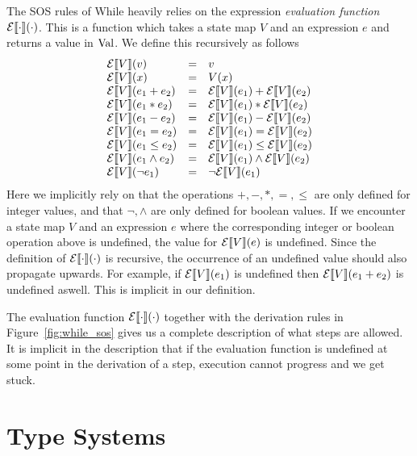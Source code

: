 The SOS rules of While heavily relies on the expression \emph{evaluation
function} $\mathcal{E}\llbracket \cdot \rrbracket(\cdot)$. This is a function which takes a state map
$V$ and an expression $e$ and returns a value in $\mbox{$\mathrm{Val}$}$. We define this
recursively as follows
\begin{equation*}
  \begin{array}{lll}
    \mathcal{E}\llbracket V \rrbracket(v) &=& v \\
    \mathcal{E}\llbracket V \rrbracket(x) &=& V(x) \\
    \mathcal{E}\llbracket V \rrbracket(e_1 + e_2) &=& \mathcal{E}\llbracket V \rrbracket(e_1) + \mathcal{E}\llbracket V \rrbracket(e_2) \\
    \mathcal{E}\llbracket V \rrbracket(e_1 * e_2) &=& \mathcal{E}\llbracket V \rrbracket(e_1) * \mathcal{E}\llbracket V \rrbracket(e_2) \\
    \mathcal{E}\llbracket V \rrbracket(e_1 - e_2) &=& \mathcal{E}\llbracket V \rrbracket(e_1) - \mathcal{E}\llbracket V \rrbracket(e_2) \\
    \mathcal{E}\llbracket V \rrbracket(e_1 = e_2) &=& \mathcal{E}\llbracket V \rrbracket(e_1) = \mathcal{E}\llbracket V \rrbracket(e_2) \\
    \mathcal{E}\llbracket V \rrbracket(e_1 \leq e_2) &=& \mathcal{E}\llbracket V \rrbracket(e_1) \leq \mathcal{E}\llbracket V \rrbracket(e_2) \\
    \mathcal{E}\llbracket V \rrbracket(e_1 \land e_2) &=& \mathcal{E}\llbracket V \rrbracket(e_1) \land \mathcal{E}\llbracket V \rrbracket(e_2) \\
    \mathcal{E}\llbracket V \rrbracket(\lnot e_1) &=& \lnot \mathcal{E}\llbracket V \rrbracket(e_1) \\
  \end{array}
\end{equation*}
Here we implicitly rely on that the operations $+, -, *, =, \leq$ are only
defined for integer values, and that $\lnot, \land$ are only defined for boolean
values.  If we encounter a state map $V$ and an expression $e$ where the
corresponding integer or boolean operation above is undefined, the value for
$\mathcal{E}\llbracket V \rrbracket(e)$ is undefined. Since the definition of $\mathcal{E}\llbracket \cdot \rrbracket(\cdot)$ is
recursive, the occurrence of an undefined value should also propagate upwards.
For example, if $\mathcal{E}\llbracket V \rrbracket(e_1)$ is undefined then $\mathcal{E}\llbracket V \rrbracket(e_1 + e_2)$ is undefined
aswell. This is implicit in our definition.

The evaluation function $\mathcal{E}\llbracket \cdot \rrbracket(\cdot)$ together with the derivation
rules in Figure~\ref{fig:while_sos} gives us a complete description of what
steps are allowed. It is implicit in the description that if the evaluation
function is undefined at some point in the derivation of a step, execution
cannot progress and we get stuck.

\section{Type Systems} \label{sec:type_systems}

